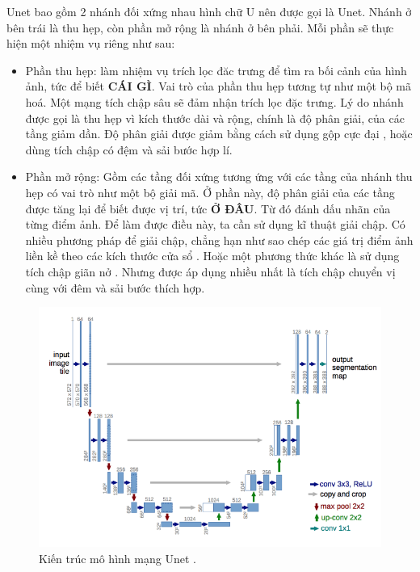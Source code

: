 \documentclass[a4paper, 12pt]{report}
\begin{document}
Unet bao gồm 2 nhánh đối xứng nhau hình chữ U nên được gọi là Unet.
Nhánh ở bên trái là thu hẹp, còn phần mở rộng là nhánh ở bên phải.
Mỗi phần sẽ thực hiện một nhiệm vụ riêng như sau:

\begin{itemize}
    \item Phần thu hẹp: làm nhiệm vụ trích lọc đăc trưng để tìm ra bối cảnh của hình ảnh, tức để biết \textbf{CÁI GÌ}.
    Vai trò của phần thu hẹp tương tự như một bộ mã hoá.
    Một mạng tích chập sâu sẽ đảm nhận trích lọc đặc trưng.
    Lý do nhánh được gọi là thu hẹp vì kích thước dài và rộng, chính là độ phân giải, của các tầng giảm dần.
    Độ phân giải được giảm bằng cách sử dụng gộp cực đại \cite{wikimaxpooling2021}, hoặc dùng tích chập có đệm và sải bước hợp lí.
    
    \item Phần mở rộng: Gồm các tầng đối xứng tương ứng với các tầng của nhánh thu hẹp có vai trò như một bộ giải mã.
    Ở phần này, độ phân giải của các tầng được tăng lại để biết được vị trí, tức \textbf{Ở ĐÂU}.
    Từ đó đánh dấu nhãn của từng điểm ảnh.
    Để làm được điều này, ta cần sử dụng kĩ thuật giải chập.
    Có nhiều phương pháp để giải chập, chẳng hạn như sao chép các giá trị điểm ảnh liền kề theo các kích thước cửa sổ \cite{khanhunet2020}.
    Hoặc một phương thức khác là sử dụng tích chập giãn nở \cite{yu2016multiscale}.
    Nhưng được áp dụng nhiều nhất là tích chập chuyển vị \cite{divyanshutransconv2020} cùng với đêm và sải bước thích hợp.
\end{itemize}

\begin{figure}[!h]
\captionsetup{width=0.8\textwidth}
\centering
\includegraphics[width=15cm]{images/2_8.png}
\caption{Kiến trúc mô hình mạng Unet \cite{ronneberger2015unet}.}
\end{figure}
\end{document}
